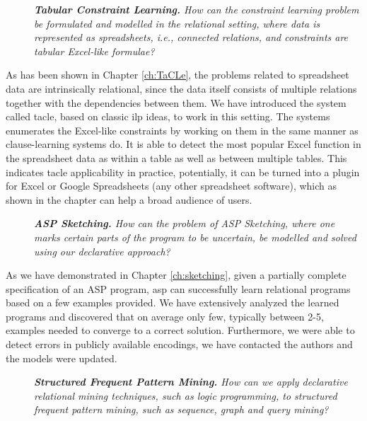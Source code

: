 \begin{description}
    \item[\ctwo] \textit{\textbf{Tabular Constraint Learning.} How can the constraint learning problem be formulated
   and modelled in the relational setting, where data is
   represented as spreadsheets, i.e., connected relations, and constraints are
   tabular Excel-like formulae?
}
\end{description}

As has been shown in Chapter \ref{ch:TaCLe}, the problems related to
spreadsheet data are intrinsically relational, since the data itself
consists of multiple relations together with the dependencies between
them. We have introduced the system called \acrlong{tacle}, based on
classic \acrshort{ilp} ideas, to work in this setting. The systems
enumerates the Excel-like constraints by working on them in the same
manner as clause-learning systems do. It is able to detect the most
popular Excel function in the spreadsheet data as within a table as
well as between multiple tables. This indicates \acrlong{tacle}
applicability in practice, potentially, it can be turned into a plugin
for Excel or Google Spreadsheets (any other spreadsheet software),
which as shown in the chapter can help a broad audience of users.

\begin{description}
    \item[\cthree] \textit{\textbf{ASP Sketching.} How can the problem of ASP
      Sketching, where one marks certain parts of the
        program to be uncertain, be modelled and solved using our
        declarative approach? 
}
\end{description}

As we have demonstrated in Chapter \ref{ch:sketching}, given a
partially complete specification of an ASP program, \acrshort{asp}
can successfully learn relational programs based on a few examples
provided. We have extensively analyzed the learned programs and
discovered that on average only few, typically between 2-5, examples needed to
converge to a correct solution. Furthermore, we were able to detect
errors in publicly available encodings, we have contacted the authors
and the models were updated.


\begin{description}
    \item[\cfour]  \textit{ \textbf{Structured Frequent Pattern Mining.}
    How can we apply declarative relational mining techniques, such as logic programming, to structured frequent pattern mining, such as sequence, graph and query mining?
}
\end{description}

